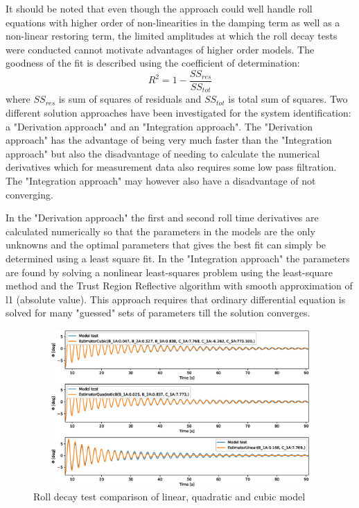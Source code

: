 It should be noted that even though the approach could well handle roll equations with higher order of non-linearities in the damping term as well as a non-linear restoring term, the limited amplitudes at which the roll decay tests were conducted cannot motivate advantages of higher order models. 
The goodness of the fit is described using the coefficient of determination:
\begin{equation} \label{eq:R2}
R^2=1-\frac{SS_{res}}{SS_{tot}}
\end{equation}
where $SS_{res}$ is sum of squares of residuals and $SS_{tot}$ is total sum of squares. Two different solution approaches have been investigated for the system identification: a "Derivation approach" and an "Integration approach". 
The "Derivation approach" has the advantage of being very much faster than the "Integration approach" but also the disadvantage of needing to calculate the numerical derivatives which for measurement data also requires some low pass filtration. The "Integration approach" may however also have a disadvantage of not converging.



In the "Derivation approach" the first and second roll time derivatives are calculated numerically so that the parameters in the models are the only unknowns and the optimal parameters that gives the best fit can simply be determined using a least square fit.
In the "Integration approach" the parameters are found by solving a nonlinear least-squares problem using the least-square method \parencite{noauthor_scipyoptimizeleast_squares_nodate} and the Trust Region Reflective algorithm with smooth approximation of l1 (absolute value). This approach requires that ordinary differential equation is solved for many "guessed" sets of parameters till the solution converges.

\begin{figure}[H]
    \centering
    \includegraphics[width=12cm, height = 6cm ]{figures/roll_decay_model_compare.eps}
    \caption{Roll decay test comparison of linear, quadratic and cubic model}
    \label{fig:roll_decay_model_compare}
\end{figure}

